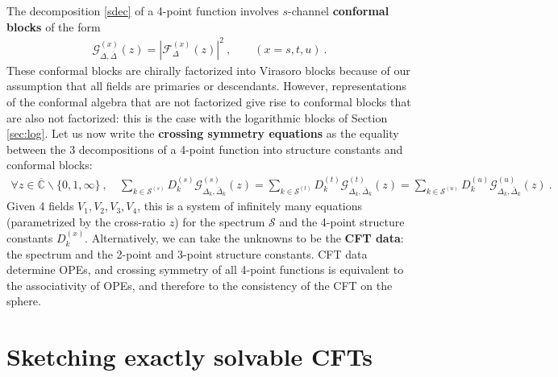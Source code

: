 \documentclass[12pt, a4paper]{article}
\newcommand{\myindex}[1]{\textbf{\boldmath #1}}
\theoremstyle{break}
\begin{document}
The decomposition \eqref{sdec} of a 4-point function involves $s$-channel \myindex{conformal blocks} of the form
\begin{align}
 \mathcal{G}^{(x)}_{\Delta,\bar\Delta}(z) = \left|\mathcal{F}_{\Delta}^{(x)}(z)\right|^2\ , \qquad (x=s,t,u)\ . 
 \label{gf2}
\end{align}
These conformal blocks are chirally factorized into Virasoro blocks because of our assumption that all fields are primaries or descendants. However, representations of the conformal algebra that are not factorized give rise to conformal blocks that are also not factorized: this is the case with the logarithmic blocks of Section \ref{sec:log}. Let us now write the \myindex{crossing symmetry equations} as the equality between the 3 decompositions of a 4-point function into structure constants and conformal blocks:
\begin{align}
 \boxed{\forall z\in \overline{\mathbb{C}}\backslash\{0,1,\infty\} \ , \quad 
 \sum_{k\in\mathcal{S}^{(s)}} D_k^{(s)} \mathcal{G}^{(s)}_{\Delta_k,\bar\Delta_k}(z) 
 = \sum_{k\in\mathcal{S}^{(t)}} D_k^{(t)} \mathcal{G}^{(t)}_{\Delta_k,\bar\Delta_k}(z) 
 = \sum_{k\in\mathcal{S}^{(u)}} D_k^{(u)} \mathcal{G}^{(u)}_{\Delta_k,\bar\Delta_k}(z)} \ . 
 \label{seteu}
\end{align}
Given 4 fields $V_1,V_2,V_3,V_4$, this is a system of infinitely many equations (parametrized by the cross-ratio $z$) for the spectrum $\mathcal{S}$ and the 4-point structure constants $D_k^{(x)}$. Alternatively, we can take the unknowns to be the \myindex{CFT data}: the spectrum and the 2-point and 3-point structure constants. CFT data determine OPEs, and crossing symmetry of all 4-point functions is equivalent to the associativity of OPEs, and therefore to the consistency of the CFT on the sphere. 


\section{Sketching exactly solvable CFTs}\label{sec:sesc}
\end{document}
